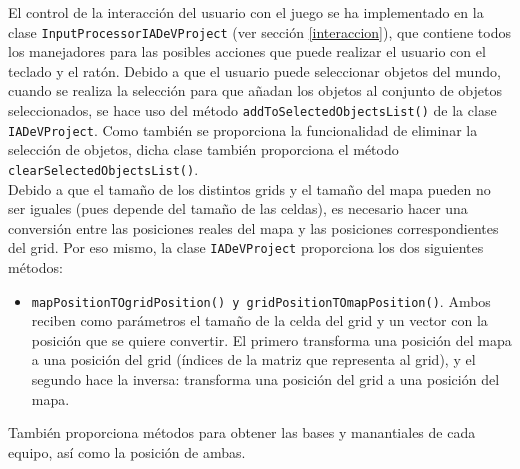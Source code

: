 El control de la interacción del usuario con el juego se ha implementado en la clase \texttt{InputProcessorIADeVProject} (ver sección \ref{interaccion}), que contiene todos los manejadores para las posibles acciones que puede realizar el usuario con el teclado y el ratón. Debido a que el usuario puede seleccionar objetos del mundo, cuando se realiza la selección para que añadan los objetos al conjunto de objetos seleccionados, se hace uso del método \texttt{addToSelectedObjectsList()} de la clase \texttt{IADeVProject}. Como también se proporciona la funcionalidad de eliminar la selección de objetos, dicha clase también proporciona el método \texttt{clearSelectedObjectsList()}. \\

Debido a que el tamaño de los distintos grids y el tamaño del mapa pueden no ser iguales (pues depende del tamaño de las celdas), es necesario hacer una conversión entre las posiciones reales del mapa y las posiciones correspondientes del grid. Por eso mismo, la clase \texttt{IADeVProject} proporciona los dos siguientes métodos:
\begin{itemize}
 \item \texttt{mapPositionTOgridPosition() y gridPositionTOmapPosition()}. Ambos reciben como parámetros el tamaño de la celda del grid y un vector con la posición que se quiere convertir. El primero transforma una posición del mapa a una posición del grid (índices de la matriz que representa al grid), y el segundo hace la inversa: transforma una posición del grid a una posición del mapa.
\end{itemize}

También proporciona métodos para obtener las bases y manantiales de cada equipo, así como la posición de ambas.

